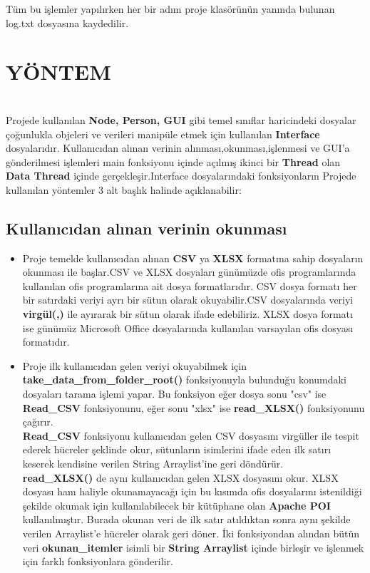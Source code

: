 \documentclass[conference]{IEEEtran}
\begin{document}
    Tüm bu işlemler yapılırken her bir adım proje klasörünün yanında bulunan log.txt dosyasına kaydedilir.
\section{\textbf{YÖNTEM}}\\
Projede kullanılan \textbf{Node, Person, GUI} gibi temel sınıflar haricindeki dosyalar çoğunlukla objeleri ve verileri manipüle etmek için kullanılan \textbf{Interface} dosyalarıdır. Kullanıcıdan alınan verinin alınması,okunması,işlenmesi ve GUI'a gönderilmesi işlemleri main fonksiyonu içinde açılmış ikinci bir \textbf{Thread} olan \textbf{Data Thread} içinde gerçekleşir.Interface dosyalarındaki fonksiyonların 
Projede kullanılan yöntemler 3 alt başlık halinde açıklanabilir:
\subsection{Kullanıcıdan alınan verinin okunması}
\begin{itemize}
    \item Proje temelde kullanıcıdan alınan \textbf{CSV} ya \textbf{XLSX} formatına sahip dosyaların okunması ile başlar.CSV ve XLSX dosyaları günümüzde ofis programlarında kullanılan ofis programlarına ait dosya formatlarıdır. CSV dosya formatı her bir satırdaki veriyi ayrı bir sütun olarak okuyabilir.CSV dosyalarında veriyi \textbf{virgül(,)} ile ayırarak bir sütun olarak ifade edebiliriz. XLSX dosya formatı ise günümüz Microsoft Office dosyalarında kullanılan varsayılan ofis dosyası formatıdır.
    \item 
    Proje ilk kullanıcıdan gelen veriyi okuyabilmek için \textbf{take\_data\_from\_folder\_root()} fonksiyonuyla bulunduğu konumdaki dosyaları tarama işlemi yapar. Bu fonksiyon eğer dosya sonu "csv" ise \textbf{Read\_CSV} fonksiyonunu, eğer sonu "xlsx" ise \textbf{read\_XLSX()} fonksiyonunu çağırır.\\
    \textbf{Read\_CSV}  fonksiyonu kullanıcıdan gelen CSV dosyasını virgüller ile tespit ederek hücreler şeklinde okur, sütunların isimlerini ifade eden ilk satırı keserek kendisine verilen String Arraylist'ine geri döndürür.\\
    \textbf{read\_XLSX()} de aynı kullanıcıdan gelen XLSX dosyasını okur. XLSX dosyası ham haliyle okunamayacağı için bu kısımda ofis dosyalarını istenildiği şekilde okumak için kullanılabilecek bir kütüphane olan \textbf{Apache POI} kullanılmıştır. Burada okunan veri de ilk satır atıldıktan sonra aynı şekilde verilen Arraylist'e hücreler olarak geri döner. İki fonksiyondan alından bütün veri \textbf{okunan\_itemler} isimli bir \textbf{String Arraylist} içinde birleşir ve işlenmek için farklı fonksiyonlara gönderilir.
\end{itemize}
\end{document}
